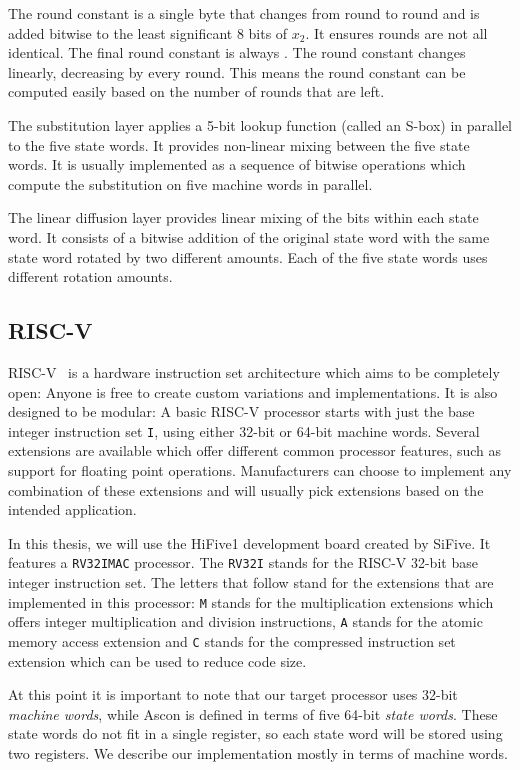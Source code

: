 The round constant is a single byte that changes from round to round and is
added bitwise to the least significant 8 bits of $x_2$. It ensures rounds are
not all identical. The final round constant is always . The round
constant changes linearly, decreasing by  every round. This means
the round constant can be computed easily based on the number of rounds that are
left.

The substitution layer applies a 5-bit lookup function (called an S-box) in
parallel to the five state words. It provides non-linear mixing between the five
state words. It is usually implemented as a sequence of bitwise operations which
compute the substitution on five machine words in parallel.

The linear diffusion layer provides linear mixing of the bits within each state
word. It consists of a bitwise addition of the original state word with the same
state word rotated by two different amounts. Each of the five state words uses
different rotation amounts.


\subsection{RISC-V}
RISC-V~\cite{riscv} is a hardware instruction set architecture which aims to be
completely open: Anyone is free to create custom variations and implementations.
It is also designed to be modular: A basic RISC-V processor starts with just the
base integer instruction set \texttt{I}, using either 32-bit or 64-bit machine
words. Several extensions are available which offer different common processor
features, such as support for floating point operations. Manufacturers can
choose to implement any combination of these extensions and will usually pick
extensions based on the intended application.

In this thesis, we will use the HiFive1 development board created by SiFive. It
features a \texttt{RV32IMAC} processor. The \texttt{RV32I} stands for the RISC-V
32-bit base integer instruction set. The letters that follow stand for the
extensions that are implemented in this processor: \texttt{M} stands for the
multiplication extensions which offers integer multiplication and division
instructions, \texttt{A} stands for the atomic memory access extension and
\texttt{C} stands for the compressed instruction set extension which can be used
to reduce code size.

At this point it is important to note that our target processor uses 32-bit
\emph{machine words}, while Ascon is defined in terms of five 64-bit
\emph{state words}. These state words do not fit in a single register, so each
state word will be stored using two registers. We describe our implementation
mostly in terms of machine words.

